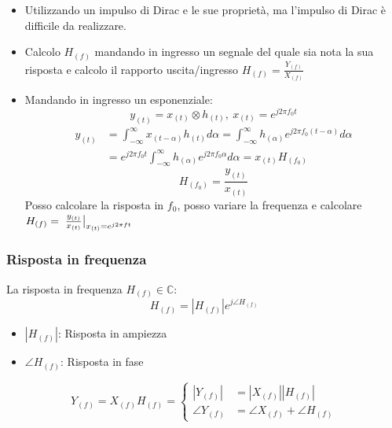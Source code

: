         \begin{itemize}
            \item {
                Utilizzando un impulso di Dirac e le sue proprietà, ma l'impulso di Dirac è difficile da realizzare. 
            }
            \item {
                Calcolo $H_{(f)}$ mandando in ingresso un segnale del quale sia nota la sua risposta e calcolo il rapporto uscita/ingresso 
                $H_{(f)} = \frac{Y_{(f)}}{X_{(f)}}$
            }
            \item {
                Mandando in ingresso un esponenziale:
                \[
                    y_{(t)} = x_{(t)}\otimes h_{(t)},\ x_{(t)} = e^{j2\pi f_0t}
                \]
                \begin{align}
                    y_{(t)} &= \int_{-\infty}^{\infty}x_{(t-\alpha)}h_{(t)}d\alpha = \int_{-\infty}^{\infty}h_{(\alpha)} e^{j2\pi f_0(t-\alpha)}d\alpha \nonumber \\
                            &= e^{j2\pi f_0t}\int_{-\infty}^{\infty}h_{(\alpha)} e^{j2\pi f_0\alpha}d\alpha = x_{(t)}H_{(f_0)} \nonumber 
                \end{align}
                \[
                    H_{(f_0)} = \frac{y_{(t)}}{x_{(t)}}
                \]  
                Posso calcolare la risposta in $f_0$, posso variare la frequenza e calcolare $H_{(f)} = \eval*{\frac{y_{(t)}}{x_{(t)}}}_{x_{(t)} = e^{j2\pi ft}}$
            }
        \end{itemize}
        \subsubsection{Risposta in frequenza}
            La risposta in frequenza $H_{(f)} \in \mathbb{C}$:
            \[
                H_{(f)} = |H_{(f)}| e^{j\angle H_{(f)} }
            \]  
            \begin{itemize}
                \item$|H_{(f)}|$: Risposta in ampiezza
                \item $\angle H_{(f)}$: Risposta in fase 
            \end{itemize}
            \[
                Y_{(f)} = X_{(f)} H_{(f)} = 
                \begin{cases}
                    |Y_{(f)}| &= |X_{(f)}||H_{(f)}| \nonumber \\
                    \angle Y_{(f)} &= \angle X_{(f)} + \angle H_{(f)} \nonumber
                \end{cases} 
            \]  

